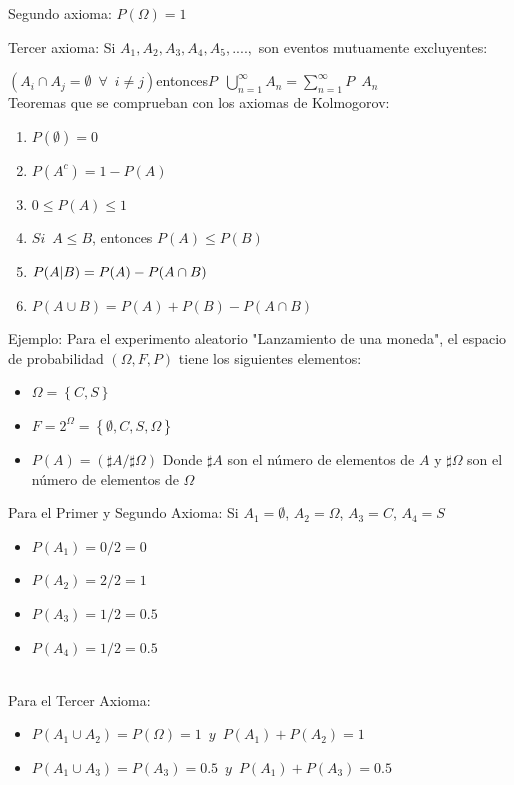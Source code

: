 \documentclass[11pt,fleqn]{book} %
\numberwithin{equation}{section} %
\numberwithin{figure}{section} %
\numberwithin{table}{section} %
\begin{document}
Segundo axioma: $P(\Omega) = 1$

Tercer axioma: Si $A_{1},  A_{2}, A_{3}, A_{4}, A_{5}, .... ,$ son eventos mutuamente excluyentes:

$(A_{i} \cap A_{j} = \emptyset \enspace \forall \enspace i \neq j) $entonces$P\enspace\bigcup_{n=1}^{\infty} A_{n}=\sum_{n=1}^{\infty}P\enspace A_{n} $
\ \\%
Teoremas que se comprueban con los axiomas de Kolmogorov:
\begin{enumerate}
    \item $P(\emptyset)=0$
    \item $P(A^{c})= 1 - P(A)$
    \item $0 \leq P(A) \leq 1$
    \item ${Si} \enspace {A \leq B}$, entonces ${P(A) \leq P(B)}$
    \item $P(A\arrowvert B) = P(A)-P(A\cap B)$
    \item $P(A\cup B) = P(A)+P(B)-P(A\cap B)$
\end{enumerate}
Ejemplo: Para el experimento aleatorio "Lanzamiento de una moneda", el espacio de probabilidad $(\Omega,F,P)$ tiene los siguientes elementos:
\begin{itemize}
    \item $\Omega = \left\lbrace {C,S} \right\rbrace $
    \item $F =  2^\Omega = \left\lbrace {\emptyset,C,S,\Omega} \right\rbrace$
    \item $P(A) = (\sharp A/\sharp \Omega)$ Donde $\sharp A$ son el número de elementos de $A$ y $\sharp \Omega$ son el número de elementos de $\Omega$
\end{itemize}
Para el Primer y Segundo Axioma: Si  $A_{1} = \emptyset$, $A_{2} = \Omega$, $A_{3} = C$, $A_{4} = S$
\begin{itemize}
    \item $P(A_{1}) =   0/2 = 0 $
    \item $P(A_{2}) =   2/2 = 1  $
    \item $P(A_{3}) =   1/2 = 0.5$
    \item $P(A_{4}) =   1/2 = 0.5  $
\end{itemize}
\ \\%
Para el Tercer Axioma:
\begin{itemize}
    \item $P(A_{1}\cup A_{2}) = P(\Omega)=1 \enspace y \enspace P(A_{1})+P(A_{2})=1$
\end{itemize}
\begin{itemize}
    \item $P(A_{1}\cup A_{3}) = P(A_{3})=0.5 \enspace y \enspace P(A_{1})+P(A_{3})=0.5$
\end{itemize}
\end{document}
